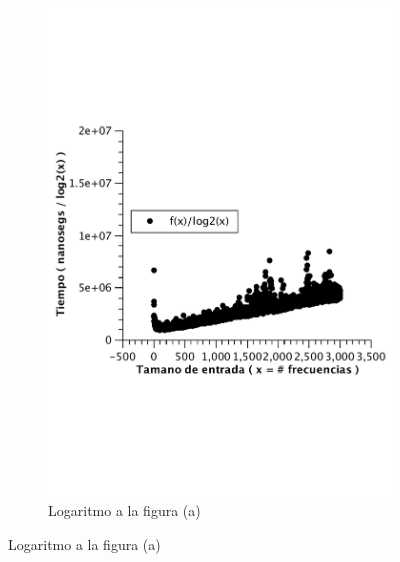 \begin{figure}[H]
\begin{subfigure}[b]{0.5\textwidth}
                \includegraphics[width=\textwidth]{imagenes/af-wc-lineal.pdf}
                \caption{Logaritmo a la figura (a)}
        \end{subfigure}
        

\end{figure}
